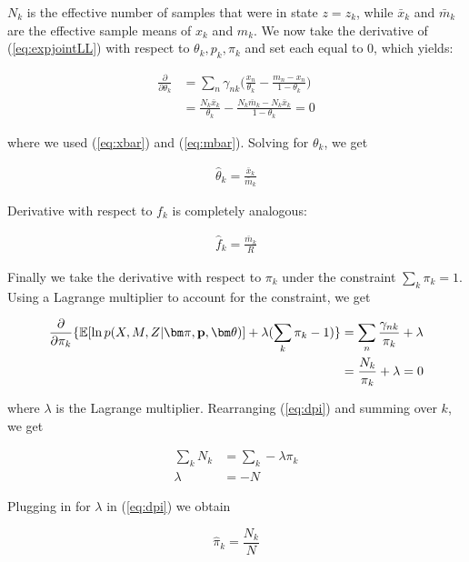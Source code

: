 \documentclass[a4paper]{article}
\newcommand{\vp}{{\bf p}}
\newcommand{\vpi}{{\bm \pi}}
\newcommand{\vtheta}{{\bm \theta}}
\newcommand{\E}{\mathbb{E}}
\begin{document}
$N_k$ is the effective number of samples that were in state $z = z_k$, while $\bar{x}_k$ and $\bar{m}_k$ are the effective sample means of $x_k$ and $m_k$. We now take the derivative of (\ref{eq:expjointLL}) with respect to $\theta_k, p_k, \pi_k$ and set each equal to 0, which yields:

\begin{align}
\frac{\partial}{\partial \theta_k} &= \sum_n \gamma_{nk} \Big( \frac{ x_n}{\theta_k} - \frac{m_n - x_n}{1- \theta_k} \Big)\\
					      &= \frac{N_k \bar{x}_k}{\theta_k} - \frac{N_k \bar{m}_k - N_k \bar{x}_k}{1- \theta_k} = 0
\end{align}

where we used (\ref{eq:xbar}) and (\ref{eq:mbar}). Solving for $\theta_k$, we get

\begin{align}
\hat{\theta}_k = \frac{\bar{x}_k}{\bar{m}_k} \label{eq:theta}
\end{align}

Derivative with respect to $f_k$ is completely analogous:

\begin{align}
\hat{f}_k = \frac{\bar{m}_k}{R} \label{eq:f}
\end{align}

Finally we take the derivative with respect to $\pi_k$ under the constraint $\sum_k \pi_k = 1$. Using a Lagrange multiplier to account for the constraint, we get

\begin{align}
\frac{\partial}{\partial \pi_k} \{ \E [ \ln p(X, M , Z | \vpi, \vp, \vtheta) ] + \lambda ( \sum_k \pi_k - 1)\} &= \sum_n \frac{\gamma_{nk}}{\pi_k} + \lambda \nonumber \\
																   &= \frac{N_k}{\pi_k} + \lambda = 0 \label{eq:dpi}
\end{align}

where $\lambda$ is the Lagrange multiplier. Rearranging (\ref{eq:dpi}) and summing over $k$, we get

\begin{align*}
\sum_k N_k &= \sum_k - \lambda \pi_k \\
      \lambda &= - N 
\end{align*}

Plugging in for $\lambda$ in (\ref{eq:dpi}) we obtain

\begin{equation}
\hat{\pi}_k = \frac{N_k}{N}
\end{equation}
\end{document}

